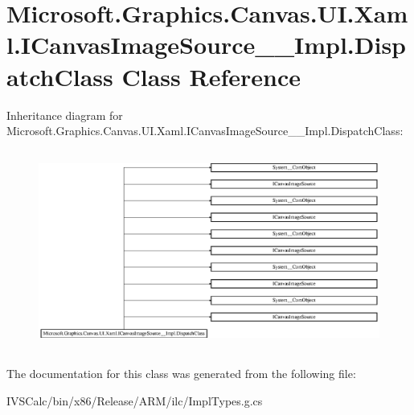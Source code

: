 \hypertarget{class_microsoft_1_1_graphics_1_1_canvas_1_1_u_i_1_1_xaml_1_1_i_canvas_image_source_____impl_1_1_dispatch_class}{}\section{Microsoft.\+Graphics.\+Canvas.\+U\+I.\+Xaml.\+I\+Canvas\+Image\+Source\+\_\+\+\_\+\+Impl.\+Dispatch\+Class Class Reference}
\label{class_microsoft_1_1_graphics_1_1_canvas_1_1_u_i_1_1_xaml_1_1_i_canvas_image_source_____impl_1_1_dispatch_class}
Inheritance diagram for Microsoft.\+Graphics.\+Canvas.\+U\+I.\+Xaml.\+I\+Canvas\+Image\+Source\+\_\+\+\_\+\+Impl.\+Dispatch\+Class\+:\begin{figure}[H]
\begin{center}
\leavevmode
\includegraphics[height=6.609442cm]{class_microsoft_1_1_graphics_1_1_canvas_1_1_u_i_1_1_xaml_1_1_i_canvas_image_source_____impl_1_1_dispatch_class}
\end{center}
\end{figure}


The documentation for this class was generated from the following file\+:\begin{DoxyCompactItemize}
\item 
I\+V\+S\+Calc/bin/x86/\+Release/\+A\+R\+M/ilc/Impl\+Types.\+g.\+cs\end{DoxyCompactItemize}
